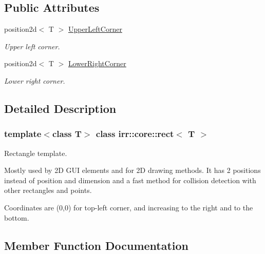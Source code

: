 \subsection*{Public Attributes}
\begin{DoxyCompactItemize}
\item 
\mbox{\label{classirr_1_1core_1_1rect_abd47b3a4967b2153e58984d964af6573}} 
position2d$<$ T $>$ \hyperlink{classirr_1_1core_1_1rect_abd47b3a4967b2153e58984d964af6573}{Upper\+Left\+Corner}
\begin{DoxyCompactList}\small\item\em Upper left corner. \end{DoxyCompactList}\item 
\mbox{\label{classirr_1_1core_1_1rect_aa7c7e38bbff5f32992f69b36fc8cec1e}} 
position2d$<$ T $>$ \hyperlink{classirr_1_1core_1_1rect_aa7c7e38bbff5f32992f69b36fc8cec1e}{Lower\+Right\+Corner}
\begin{DoxyCompactList}\small\item\em Lower right corner. \end{DoxyCompactList}\end{DoxyCompactItemize}


\subsection{Detailed Description}
\subsubsection*{template$<$class T$>$\newline
class irr\+::core\+::rect$<$ T $>$}

Rectangle template. 

Mostly used by 2D G\+UI elements and for 2D drawing methods. It has 2 positions instead of position and dimension and a fast method for collision detection with other rectangles and points.

Coordinates are (0,0) for top-\/left corner, and increasing to the right and to the bottom. 

\subsection{Member Function Documentation}
\mbox{\label{classirr_1_1core_1_1rect_a0b7496319a32ceda640c730f5822f1ef}} 
